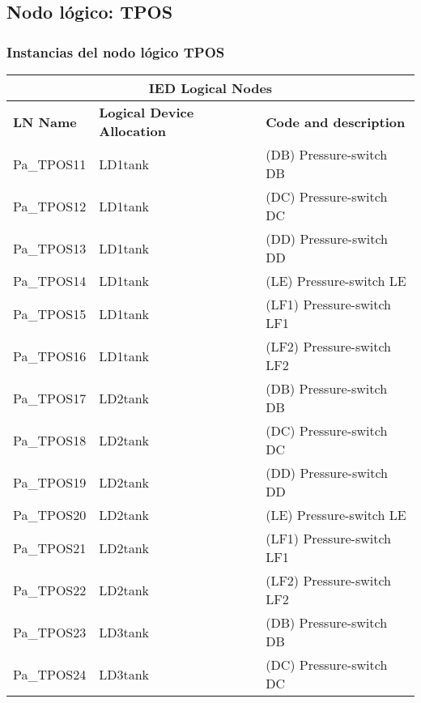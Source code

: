 
\subsection{Nodo l\'ogico: 			 TPOS}

    \subsubsection{Instancias del nodo l\'ogico TPOS}
    \begin{table}[H]
    \begin{center}
    \begin{tabular}{|l|l|p{6.8cm}|}
            \hline
            \multicolumn{3}{|c|}{\cellcolor[gray]{0.8} \textbf{IED Logical Nodes} } \\
            \hline
            \textbf{LN Name} & \textbf{Logical Device Allocation} & \textbf{Code and description} \\
            \hline
            Pa\_TPOS11 & LD1tank & (DB) Pressure-switch DB \\
            \hline
            Pa\_TPOS12 & LD1tank & (DC) Pressure-switch DC \\
            \hline
            Pa\_TPOS13 & LD1tank & (DD) Pressure-switch DD \\
            \hline
            Pa\_TPOS14 & LD1tank & (LE) Pressure-switch LE \\
            \hline
            Pa\_TPOS15 & LD1tank & (LF1) Pressure-switch LF1 \\
            \hline
            Pa\_TPOS16 & LD1tank & (LF2) Pressure-switch LF2 \\
            \hline
            Pa\_TPOS17 & LD2tank & (DB) Pressure-switch DB \\
            \hline
            Pa\_TPOS18 & LD2tank & (DC) Pressure-switch DC \\
            \hline
            Pa\_TPOS19 & LD2tank & (DD) Pressure-switch DD \\
            \hline
            Pa\_TPOS20 & LD2tank & (LE) Pressure-switch LE \\
            \hline
            Pa\_TPOS21 & LD2tank & (LF1) Pressure-switch LF1 \\
            \hline
            Pa\_TPOS22 & LD2tank & (LF2) Pressure-switch LF2 \\
            \hline
            Pa\_TPOS23 & LD3tank & (DB) Pressure-switch DB \\
            \hline
            Pa\_TPOS24 & LD3tank & (DC) Pressure-switch DC \\

\end{tabular}
\end{center}
\end{table}
